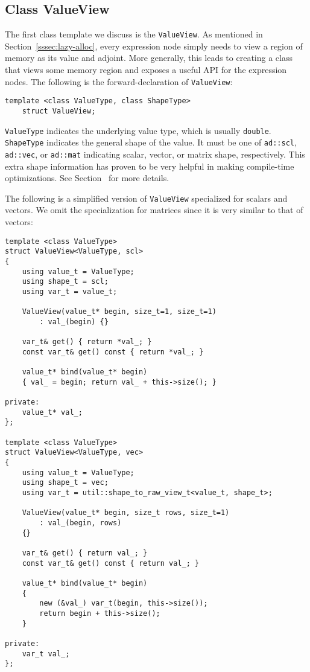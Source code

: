 \subsection{Class ValueView}

The first class template we discuss is the \verb|ValueView|.
As mentioned in Section~\ref{sssec:lazy-alloc},
every expression node simply needs to view a region of memory as its value and adjoint.
More generally, this leads to creating a class that views some memory region
and exposes a useful API for the expression nodes.
The following is the forward-declaration of \verb|ValueView|:
\begin{lstlisting}[style=customcpp]
    template <class ValueType, class ShapeType>
    struct ValueView;
\end{lstlisting}
\verb|ValueType| indicates the underlying value type, which is usually \verb|double|.
\verb|ShapeType| indicates the general shape of the value.
It must be one of \verb|ad::scl|, \verb|ad::vec|, or \verb|ad::mat| 
indicating scalar, vector, or matrix shape, respectively.
This extra shape information has proven to be very helpful in making compile-time optimizations.
See Section~ for more details.

The following is a simplified version of \verb|ValueView| specialized for scalars and vectors.
We omit the specialization for matrices since it is very similar to that of vectors:
\begin{lstlisting}[style=customcpp]
template <class ValueType>
struct ValueView<ValueType, scl>
{
    using value_t = ValueType;
    using shape_t = scl;
    using var_t = value_t;

    ValueView(value_t* begin, size_t=1, size_t=1)
        : val_(begin) {}

    var_t& get() { return *val_; }
    const var_t& get() const { return *val_; }

    value_t* bind(value_t* begin)
    { val_ = begin; return val_ + this->size(); }

private:
    value_t* val_;
};

template <class ValueType>
struct ValueView<ValueType, vec>
{
    using value_t = ValueType;
    using shape_t = vec;
    using var_t = util::shape_to_raw_view_t<value_t, shape_t>;

    ValueView(value_t* begin, size_t rows, size_t=1)
        : val_(begin, rows)
    {}
     
    var_t& get() { return val_; }
    const var_t& get() const { return val_; }

    value_t* bind(value_t* begin)
    { 
        new (&val_) var_t(begin, this->size());
        return begin + this->size(); 
    }

private:
    var_t val_;
};
\end{lstlisting}

